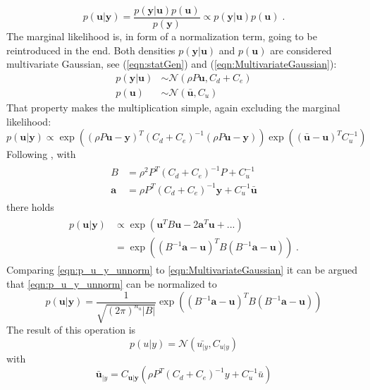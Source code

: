 \documentclass[%
  a4paper,oneside,%
  11pt,%
  smallchapters,
  green,%
  rgb, <cmyk>
  ]{tubsbook}
\begin{document}
\begin{equation}
p(\bm{u}|\bm{y}) = \frac{p(\bm{y}|\bm{u})p(\bm{u})}{p(\bm{y})} \propto p(\bm{y}|\bm{u})p(\bm{u}) \;.
\end{equation}
The marginal likelihood is, in form of a normalization term, going to be reintroduced in the end. Both densities $p(\bm{y}|\bm{u})$ and $p(\bm{u})$ are considered multivariate Gaussian, see (\ref{eqn:statGen}) and (\ref{eqn:MultivariateGaussian}):
\begin{align}
p(\bm{y}|\bm{u}) &\sim \mathcal{N} (\rho P \bm{u}, C_d + C_e) \\
p(\bm{u}) &\sim \mathcal{N}(\bm{\bar{u}},C_u)
\end{align}
%
That property makes the multiplication simple, again excluding the marginal likelihood:
\begin{equation}
p(\bm{u}|\bm{y}) \propto  \exp(  (\rho P \bm{u} -\bm{y})^T (C_d + C_e)^{-1} (\rho P \bm{u} -\bm{y})  ) \exp(  (\bar{\bm{u}} - \bm{u})^T C_u^{-1}  )
\end{equation}
Following \cite{girolami2021}, with
\begin{align}
\begin{split}
B &= \rho^2 P^T (C_d +C_e)^{-1} P + C_u^{-1} \\
\bm{a} &= \rho P^T (C_d +C_e)^{-1} \bm{y} + C_u^{-1} \bm{\bar{u}}
\end{split}
\end{align}
there holds
\begin{align}
\begin{split}
p(\bm{u}|\bm{y}) &\propto \exp(\bm{u}^T B \bm{u} - 2\bm{a}^T\bm{u} + ... ) \\
&= \exp( (B^{-1} \bm{a} - \bm{u} )^T  B (B^{-1} \bm{a} - \bm{u} ) ) \;.
\label{eqn:p_u_y_unnorm}
\end{split}
\end{align}
Comparing \ref{eqn:p_u_y_unnorm} to \ref{eqn:MultivariateGaussian} it can be argued that \ref{eqn:p_u_y_unnorm} can be normalized to 
\begin{equation}
p(\bm{u}|\bm{y}) = \frac{1}{\sqrt{(2\pi)^{n_u} \lvert B \rvert}} \exp( (B^{-1} \bm{a} - \bm{u} )^T  B (B^{-1} \bm{a} - \bm{u} ) )
\end{equation} 
%
The result of this operation is
%
\begin{equation}
p(u|y) = \mathcal{N}(\bar{u_{|y}}, C_{u|y})
\end{equation}
%
with
%
\begin{equation}
\bm{\bar{u}}_{|y} = C_{\bm{u}|\bm{y}} \left(   \rho P^T  (C_d + C_e)^{-1}  y  +  C_u^{-1}  \bar{u}   \right)
\end{equation}
\end{document}
